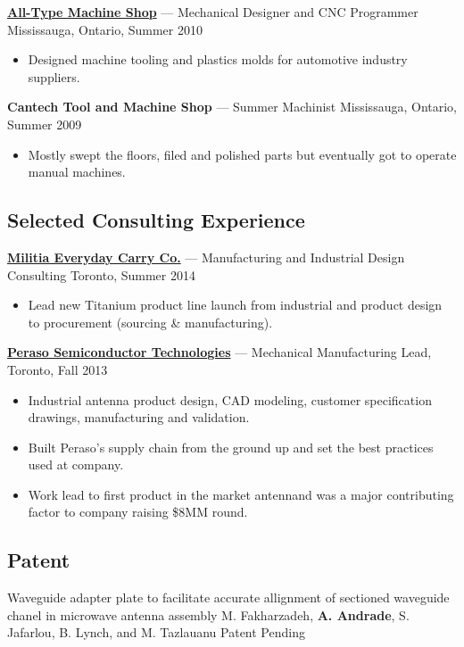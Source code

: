 \documentclass[pdftex,11pt,letterpaper]{article}
\begin{document}
\href{http://atmshop.ca/}{\textbf{All-Type Machine Shop}} --- Mechanical Designer and CNC Programmer \hfill {\color{gray} Mississauga, Ontario, Summer 2010}
\begin{itemize}
\item Designed machine tooling and plastics molds for automotive industry suppliers.
\end{itemize}

\textbf{Cantech Tool and Machine Shop} --- Summer Machinist \hfill {\color{gray} Mississauga, Ontario, Summer 2009}
\begin{itemize}
\item Mostly swept the floors, filed and polished parts but eventually got to operate manual machines.
\end{itemize}
  
\subsection*{Selected Consulting Experience}

\href{http://www.haloculturecanada.com/collections/titanium-flash-edc}{\textbf{Militia Everyday Carry Co.}} --- Manufacturing and Industrial Design Consulting \hfill {\color{gray} Toronto, Summer 2014}
\begin{itemize}
  \item Lead new Titanium product line launch from industrial and product design to procurement (sourcing \& manufacturing).
\end{itemize}

\href{http://www.perasotech.com/}{\textbf{Peraso Semiconductor Technologies}} --- Mechanical Manufacturing Lead, \hfill {\color{gray} Toronto, Fall 2013}
\begin{itemize}
  \item Industrial antenna product design, CAD modeling, customer specification drawings, manufacturing and validation.
  \item Built Peraso's supply chain from the ground up and set the best practices used at company.
  \item Work lead to first product in the market antennand was a major contributing factor to company raising \$8MM round.
\end{itemize}

\subsection*{Patent}
Waveguide adapter plate to facilitate accurate allignment of sectioned waveguide chanel in microwave antenna assembly \color{gray} {M. Fakharzadeh, \textbf{A. Andrade}, S. Jafarlou, B. Lynch, and M. Tazlauanu} \hfill {\color{gray} Patent Pending}
\color{black}
\end{document}
